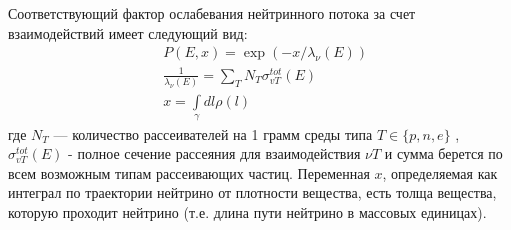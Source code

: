 Соответствующий фактор ослабевания нейтринного потока за счет взаимодействий имеет следующий вид:
\begin{equation}
    \begin{aligned}
            &P(E,x) = \exp(-x/\lambda_{\nu}(E))\\
            &\frac{1}{\lambda_{\nu}(E)} = \sum_TN_T\sigma^{tot}_{vT}(E)\\
            & x = \int\limits_{\gamma}dl\rho(l)
    \end{aligned}
\end{equation}
где $N_T$ — количество рассеивателей на 1 грамм среды типа $T\in \{p,n,e\}$ , $\sigma^{tot}_{vT}(E)$ - полное сечение рассеяния для взаимодействия $\nu T$ и сумма берется по всем возможным типам рассеивающих частиц. Переменная $x$, определяемая как интеграл по траектории нейтрино от плотности вещества, есть толща вещества, которую проходит нейтрино (т.е. длина пути нейтрино в массовых единицах).  
